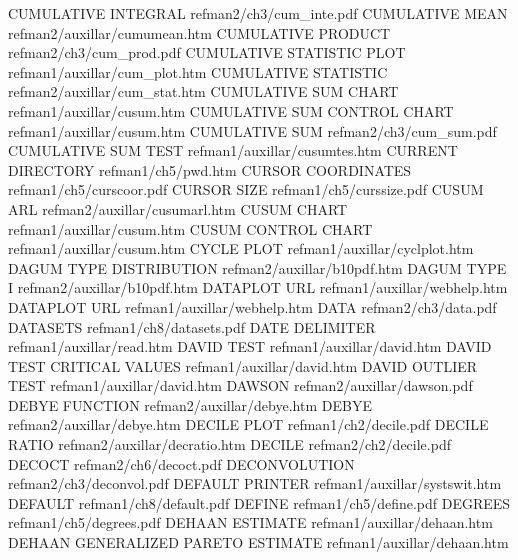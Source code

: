 CUMULATIVE INTEGRAL                     refman2/ch3/cum_inte.pdf
CUMULATIVE MEAN                         refman2/auxillar/cumumean.htm
CUMULATIVE PRODUCT                      refman2/ch3/cum_prod.pdf
CUMULATIVE STATISTIC PLOT               refman1/auxillar/cum_plot.htm
CUMULATIVE STATISTIC                    refman2/auxillar/cum_stat.htm
CUMULATIVE SUM CHART                    refman1/auxillar/cusum.htm
CUMULATIVE SUM CONTROL CHART            refman1/auxillar/cusum.htm
CUMULATIVE SUM                          refman2/ch3/cum_sum.pdf
CUMULATIVE SUM TEST                     refman1/auxillar/cusumtes.htm
CURRENT DIRECTORY                       refman1/ch5/pwd.htm
CURSOR COORDINATES                      refman1/ch5/curscoor.pdf
CURSOR SIZE                             refman1/ch5/curssize.pdf
CUSUM ARL                               refman2/auxillar/cusumarl.htm
CUSUM CHART                             refman1/auxillar/cusum.htm
CUSUM CONTROL CHART                     refman1/auxillar/cusum.htm
CYCLE PLOT                              refman1/auxillar/cyclplot.htm
DAGUM TYPE DISTRIBUTION                 refman2/auxillar/b10pdf.htm
DAGUM TYPE I                            refman2/auxillar/b10pdf.htm
DATAPLOT URL                            refman1/auxillar/webhelp.htm
DATAPLOT URL                            refman1/auxillar/webhelp.htm
DATA                                    refman2/ch3/data.pdf
DATASETS                                refman1/ch8/datasets.pdf
DATE DELIMITER                          refman1/auxillar/read.htm
DAVID TEST                              refman1/auxillar/david.htm
DAVID TEST CRITICAL VALUES              refman1/auxillar/david.htm
DAVID OUTLIER TEST                      refman1/auxillar/david.htm
DAWSON                                  refman2/auxillar/dawson.pdf
DEBYE FUNCTION                          refman2/auxillar/debye.htm
DEBYE                                   refman2/auxillar/debye.htm
DECILE PLOT                             refman1/ch2/decile.pdf
DECILE RATIO                            refman2/auxillar/decratio.htm
DECILE                                  refman2/ch2/decile.pdf
DECOCT                                  refman2/ch6/decoct.pdf
DECONVOLUTION                           refman2/ch3/deconvol.pdf
DEFAULT PRINTER                         refman1/auxillar/systswit.htm
DEFAULT                                 refman1/ch8/default.pdf
DEFINE                                  refman1/ch5/define.pdf
DEGREES                                 refman1/ch5/degrees.pdf
DEHAAN ESTIMATE                         refman1/auxillar/dehaan.htm
DEHAAN GENERALIZED PARETO  ESTIMATE     refman1/auxillar/dehaan.htm
